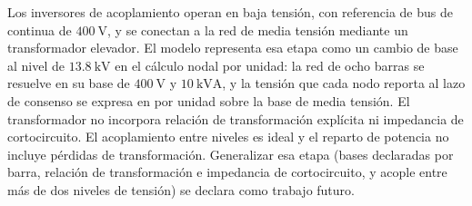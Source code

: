 Los inversores de acoplamiento operan en baja tensión, con referencia de bus de continua de $400\ \text{V}$, y se conectan a la red de media tensión mediante un transformador elevador. El modelo representa esa etapa como un cambio de base al nivel de $13.8\ \text{kV}$ en el cálculo nodal por unidad: la red de ocho barras se resuelve en su base de $400\ \text{V}$ y $10\ \text{kVA}$, y la tensión que cada nodo reporta al lazo de consenso se expresa en por unidad sobre la base de media tensión. El transformador no incorpora relación de transformación explícita ni impedancia de cortocircuito. El acoplamiento entre niveles es ideal y el reparto de potencia no incluye pérdidas de transformación. Generalizar esa etapa (bases declaradas por barra, relación de transformación e impedancia de cortocircuito, y acople entre más de dos niveles de tensión) se declara como trabajo futuro.

